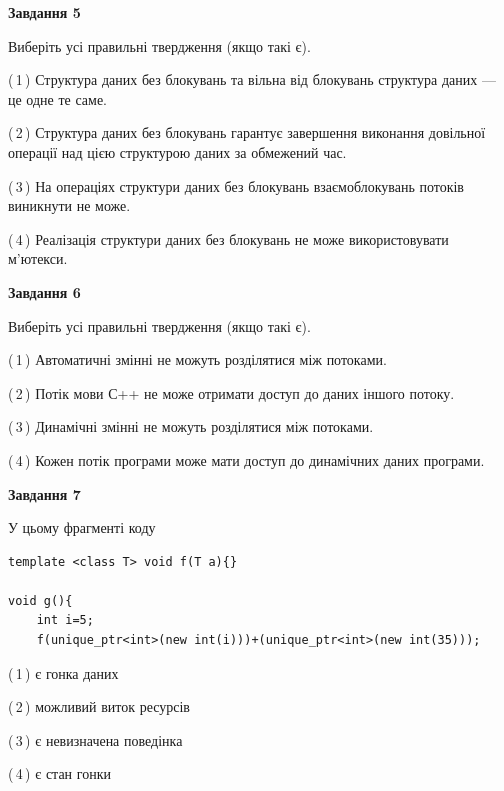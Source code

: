 \documentclass[12pt, ukrainian]{article}
\begin{document}
\begin {large}
{\begin{center}
\textbf{Завдання 5}
\end{center}

Виберіть усі правильні твердження (якщо такі є).\par
\vspace{2mm}

(\,1\,) Структура даних без блокувань та вільна від блокувань структура даних --- це одне те саме.%

(\,2\,) Структура даних без блокувань гарантує завершення виконання довільної операції над цією структурою даних за обмежений час.%

(\,3\,) На операціях структури даних без блокувань взаємоблокувань потоків виникнути не може.%

(\,4\,) Реалізація структури даних без блокувань не може використовувати м’ютекси.%
\newpage


\begin{center}
\textbf{Завдання 6}
\end{center}

Виберіть усі правильні твердження (якщо такі є).\par
\vspace{2mm}

(\,1\,) Автоматичні змінні не можуть розділятися між потоками.%

(\,2\,) Потік мови С++ не може отримати доступ до даних іншого потоку.%

(\,3\,) Динамічні змінні не можуть розділятися між потоками.%

(\,4\,) Кожен потік програми може мати доступ до динамічних даних програми.%


\begin{center}
\textbf{Завдання 7}
\end{center}

У цьому фрагменті коду
\begin{verbatim}
template <class T> void f(T a){}

void g(){
    int i=5;
    f(unique_ptr<int>(new int(i)))+(unique_ptr<int>(new int(35)));
\end{verbatim}
(\,1\,) є гонка даних%

(\,2\,) можливий виток ресурсів%

(\,3\,) є невизначена поведінка%

(\,4\,) є стан гонки%

}
\end {large}

\vspace{4mm}
\newpage
\end{document}
